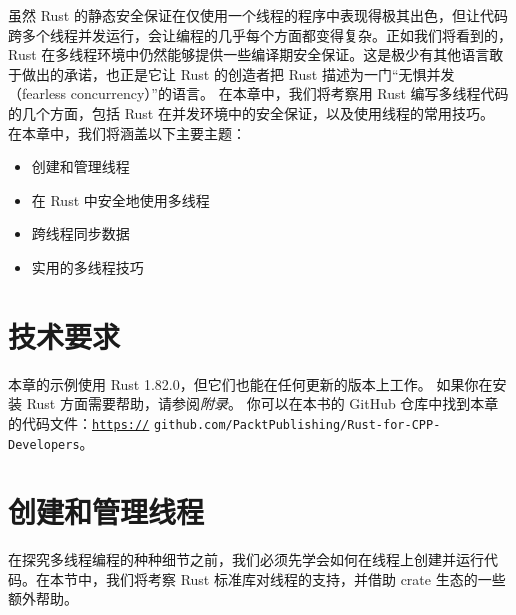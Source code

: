 虽然 Rust 的静态安全保证在仅使用一个线程的程序中表现得极其出色，但让代码跨多个线程并发运行，会让编程的几乎每个方面都变得复杂。正如我们将看到的，Rust 在多线程环境中仍然能够提供一些编译期安全保证。这是极少有其他语言敢于做出的承诺，也正是它让 Rust 的创造者把 Rust 描述为一门“无惧并发（fearless concurrency）”的语言。
在本章中，我们将考察用 Rust 编写多线程代码的几个方面，包括 Rust 在并发环境中的安全保证，以及使用线程的常用技巧。
在本章中，我们将涵盖以下主要主题：
\begin{itemize}
  \item 创建和管理线程
  \item 在 Rust 中安全地使用多线程
  \item 跨线程同步数据
  \item 实用的多线程技巧
\end{itemize}
\section{技术要求}
本章的示例使用 Rust 1.\allowbreak{}82.\allowbreak{}0，但它们也能在任何更新的版本上工作。
如果你在安装 Rust 方面需要帮助，请参阅\emph{附录}。
你可以在本书的 GitHub 仓库中找到本章的代码文件：\href{https://}{\texttt{https://}}
\texttt{github.\allowbreak{}com/\allowbreak{}PacktPublishing/\allowbreak{}Rust-\allowbreak{}for-\allowbreak{}CPP-\allowbreak{}Developers}。
\section{创建和管理线程}
\label{idx:idx_4e16aba1}
\label{idx:idx_105d9fc1}
在探究多线程编程的种种细节之前，我们必须先学会如何在线程上创建并运行代码。在本节中，我们将考察 Rust 标准库对线程的支持，并借助 crate 生态的一些额外帮助。
